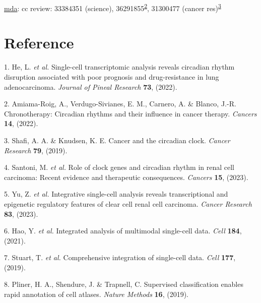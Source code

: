 \documentclass[
]{article}
\newenvironment{cslreferences}%
  {}%
  {\par}
\begin{document}
\href{review\%20of\%20EMT,\%20MET\%20or\%20EMP\%5B@EpithelialMeseLuWe2019\%5D}{mda}: cc review: 33384351 (science), 36291855\textsuperscript{\protect\hyperlink{ref-ChronotherapyAmiama2022}{2}}, 31300477 (cancer res)\textsuperscript{\protect\hyperlink{ref-CancerAndTheShafi2019}{3}}

\hypertarget{bibliography}{%
\section*{Reference}\label{bibliography}}

\hypertarget{refs}{}
\begin{cslreferences}
\leavevmode\hypertarget{ref-SingleCellTraHeLe2022}{}%
1. He, L. \emph{et al.} Single-cell transcriptomic analysis reveals circadian rhythm disruption associated with poor prognosis and drug-resistance in lung adenocarcinoma. \emph{Journal of Pineal Research} \textbf{73}, (2022).

\leavevmode\hypertarget{ref-ChronotherapyAmiama2022}{}%
2. Amiama-Roig, A., Verdugo-Sivianes, E. M., Carnero, A. \& Blanco, J.-R. Chronotherapy: Circadian rhythms and their influence in cancer therapy. \emph{Cancers} \textbf{14}, (2022).

\leavevmode\hypertarget{ref-CancerAndTheShafi2019}{}%
3. Shafi, A. A. \& Knudsen, K. E. Cancer and the circadian clock. \emph{Cancer Research} \textbf{79}, (2019).

\leavevmode\hypertarget{ref-RoleOfClockGSanton2023}{}%
4. Santoni, M. \emph{et al.} Role of clock genes and circadian rhythm in renal cell carcinoma: Recent evidence and therapeutic consequences. \emph{Cancers} \textbf{15}, (2023).

\leavevmode\hypertarget{ref-IntegrativeSinYuZh2023}{}%
5. Yu, Z. \emph{et al.} Integrative single-cell analysis reveals transcriptional and epigenetic regulatory features of clear cell renal cell carcinoma. \emph{Cancer Research} \textbf{83}, (2023).

\leavevmode\hypertarget{ref-IntegratedAnalHaoY2021}{}%
6. Hao, Y. \emph{et al.} Integrated analysis of multimodal single-cell data. \emph{Cell} \textbf{184}, (2021).

\leavevmode\hypertarget{ref-ComprehensiveIStuart2019}{}%
7. Stuart, T. \emph{et al.} Comprehensive integration of single-cell data. \emph{Cell} \textbf{177}, (2019).

\leavevmode\hypertarget{ref-SupervisedClasPliner2019}{}%
8. Pliner, H. A., Shendure, J. \& Trapnell, C. Supervised classification enables rapid annotation of cell atlases. \emph{Nature Methods} \textbf{16}, (2019).


\end{cslreferences}
\end{document}
